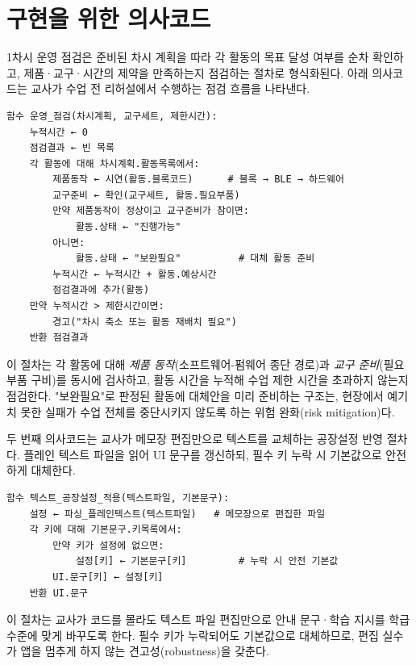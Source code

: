 \section{구현을 위한 의사코드}

1차시 운영 점검은 준비된 차시 계획을 따라 각 활동의 목표 달성 여부를 순차 확인하고, 제품·교구·시간의 제약을 만족하는지 점검하는 절차로 형식화된다. 아래 의사코드는 교사가 수업 전 리허설에서 수행하는 점검 흐름을 나타낸다.

\begin{verbatim}
함수 운영_점검(차시계획, 교구세트, 제한시간):
    누적시간 ← 0
    점검결과 ← 빈 목록
    각 활동에 대해 차시계획.활동목록에서:
        제품동작 ← 시연(활동.블록코드)      # 블록 → BLE → 하드웨어
        교구준비 ← 확인(교구세트, 활동.필요부품)
        만약 제품동작이 정상이고 교구준비가 참이면:
            활동.상태 ← "진행가능"
        아니면:
            활동.상태 ← "보완필요"          # 대체 활동 준비
        누적시간 ← 누적시간 + 활동.예상시간
        점검결과에 추가(활동)
    만약 누적시간 > 제한시간이면:
        경고("차시 축소 또는 활동 재배치 필요")
    반환 점검결과
\end{verbatim}

이 절차는 각 활동에 대해 \emph{제품 동작}(소프트웨어-펌웨어 종단 경로)과 \emph{교구 준비}(필요 부품 구비)를 동시에 검사하고, 활동 시간을 누적해 수업 제한 시간을 초과하지 않는지 점검한다. "보완필요"로 판정된 활동에 대체안을 미리 준비하는 구조는, 현장에서 예기치 못한 실패가 수업 전체를 중단시키지 않도록 하는 위험 완화(risk mitigation)다.

두 번째 의사코드는 교사가 메모장 편집만으로 텍스트를 교체하는 공장설정 반영 절차다. 플레인 텍스트 파일을 읽어 UI 문구를 갱신하되, 필수 키 누락 시 기본값으로 안전하게 대체한다.

\begin{verbatim}
함수 텍스트_공장설정_적용(텍스트파일, 기본문구):
    설정 ← 파싱_플레인텍스트(텍스트파일)   # 메모장으로 편집한 파일
    각 키에 대해 기본문구.키목록에서:
        만약 키가 설정에 없으면:
            설정[키] ← 기본문구[키]         # 누락 시 안전 기본값
        UI.문구[키] ← 설정[키]
    반환 UI.문구
\end{verbatim}

이 절차는 교사가 코드를 몰라도 텍스트 파일 편집만으로 안내 문구·학습 지시를 학급 수준에 맞게 바꾸도록 한다. 필수 키가 누락되어도 기본값으로 대체하므로, 편집 실수가 앱을 멈추게 하지 않는 견고성(robustness)을 갖춘다\cite{hunt1999pragmatic, iso25010}.

